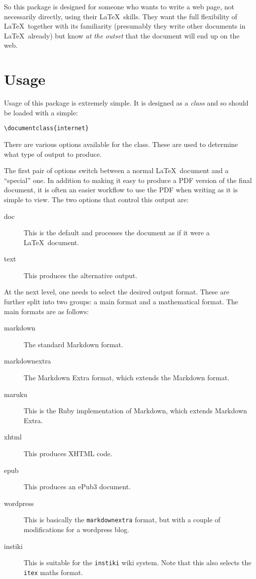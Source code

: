 \documentclass[%
  use filename,
  markdownextra={section level=2}
]{internet}
\begin{document}
So this package is designed for someone who wants to write a web page, not necessarily directly, using their \LaTeX\ skills.
They want the full flexibility of \LaTeX\ together with its familiarity (presumably they write other documents in \LaTeX\ already) but know \emph{at the outset} that the document will end up on the web.

\section{Usage}

Usage of this package is extremely simple.
It is designed as a \emph{class} and so should be loaded with a simple:

\begin{verbatim}
\documentclass{internet}
\end{verbatim}

There are various options available for the class.
These are used to determine what type of output to produce.

The first pair of options switch between a normal \LaTeX\ document and a ``special'' one.
In addition to making it easy to produce a PDF version of the final document, it is often an easier workflow to use the PDF when writing as it is simple to view.
The two options that control this output are:

\begin{description}
\item[doc] This is the default and processes the document as if it were a \LaTeX\ document.
\item[text] This produces the alternative output.
\end{description}

At the next level, one needs to select the desired output format.
These are further split into two groups: a main format and a mathematical format.
The main formats are as follows:

\begin{description}
\item[markdown] The standard Markdown format.
\item[markdownextra] The Markdown Extra format, which extends the Markdown format.
\item[maruku] This is the Ruby implementation of Markdown, which extends Markdown Extra.
\item[xhtml] This produces XHTML code.
\item[epub] This produces an ePub3 document.
\item[wordpress] This is basically the \verb+markdownextra+ format, but with a couple of modifications for a wordpress blog.
\item[instiki] This is suitable for the \verb+instiki+ wiki system.
Note that this also selects the \verb+itex+ maths format.
\end{description}
\end{document}
